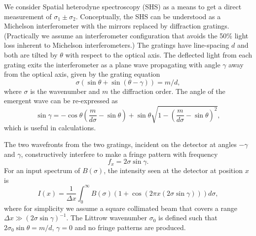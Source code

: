 \documentclass[preprint]{aastex}
\begin{document}
We consider Spatial heterodyne spectroscopy (SHS) \citep{1990SPIE.1235..622H}
as a means to get a direct measurement of  $\sigma_1\pm\sigma_2$.
Conceptually, the SHS can be understood as a Michelson interferometer with the  mirrors replaced by diffraction gratings.
(Practically we assume an interferometer configuration that  avoids the 50\% light loss inherent to  Michelson interferometers.)
The gratings have line-spacing $d$ and both are tilted
by $\theta$ with respect to the optical axis.  The deflected light from each grating exits the interferometer as a plane wave
propagating with angle $\gamma$ away from the optical axis,  given by the grating equation
\begin{equation}
\sigma\left(\sin{\theta}+\sin{\left(\theta-\gamma\right)}\right)=m/d,
\end{equation}
where $\sigma$ is the wavenumber and $m$ the diffraction order.
The angle of the emergent wave can be re-expressed as
\begin{equation}
\sin{\gamma}=-\cos{\theta} \left(\frac{m}{d\sigma} - \sin{\theta} \right)+ \sin{\theta}\sqrt{1-\left(\frac{m}{d\sigma} -\sin{\theta} \right)^2},
\end{equation}
which is useful in calculations.

The two wavefronts from the two gratings, incident on the detector at angles $-\gamma$ and $\gamma$, constructively interfere to make a fringe
pattern with  frequency
\begin{equation}
f_x=2\sigma\sin{\gamma}.
\end{equation}
For an input spectrum of $B(\sigma)$, the intensity seen at the detector at position $x$ is
\begin{equation}
I(x)=\frac{1}{\Delta x}\int_{0}^{\infty} B(\sigma)\left(1+\cos{\left(2 \pi x (2\sigma \sin{\gamma})\right)}\right)d\sigma,
\end{equation}
where for simplicity we assume a square collimated beam that covers
a range  $\Delta x \gg \left(2\sigma \sin{\gamma}\right)^{-1}$.
The Littrow wavenumber $\sigma_0$ is defined such that $2\sigma_0\sin{\theta}=m/d$, $\gamma=0$ and no fringe patterns are produced.
\end{document}
